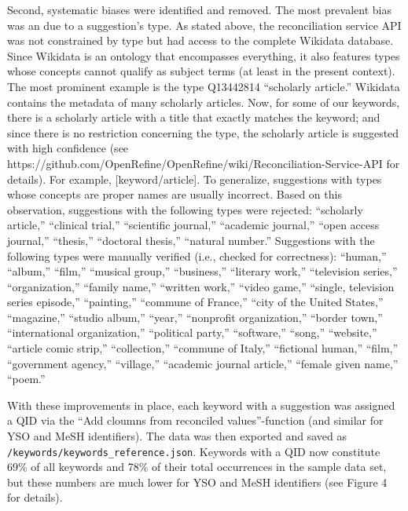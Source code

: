 Second, systematic biases were identified and removed. The most
prevalent bias was an due to a suggestion's type. As stated above, the
reconciliation service API was not constrained by type but had access to
the complete Wikidata database. Since Wikidata is an ontology that
encompasses everything, it also features types whose concepts cannot
qualify as subject terms (at least in the present context). The most
prominent example is the type Q13442814 ``scholarly article.'' Wikidata
contains the metadata of many scholarly articles. Now, for some of our
keywords, there is a scholarly article with a title that exactly matches
the keyword; and since there is no restriction concerning the type, the
scholarly article is suggested with high confidence (see
https://github.com/OpenRefine/OpenRefine/wiki/Reconciliation-Service-API
for details). For example, {[}keyword/article{]}. To generalize,
suggestions with types whose concepts are proper names are usually
incorrect. Based on this observation, suggestions with the following
types were rejected: ``scholarly article,'' ``clinical trial,''
``scientific journal,'' ``academic journal,'' ``open access journal,''
``thesis,'' ``doctoral thesis,'' ``natural number.'' Suggestions with
the following types were manually verified (i.e., checked for
correctness): ``human,'' ``album,'' ``film,'' ``musical group,''
``business,'' ``literary work,'' ``television series,''
``organization,'' ``family name,'' ``written work,'' ``video game,''
``single, television series episode,'' ``painting,'' ``commune of
France,'' ``city of the United States,'' ``magazine,'' ``studio album,''
``year,'' ``nonprofit organization,'' ``border town,'' ``international
organization,'' ``political party,'' ``software,'' ``song,''
``website,'' ``article comic strip,'' ``collection,'' ``commune of
Italy,'' ``fictional human,'' ``film,'' ``government agency,''
``village,'' ``academic journal article,'' ``female given name,''
``poem.''

With these improvements in place, each keyword with a suggestion was
assigned a QID via the ``Add cloumns from reconciled values''-function
(and similar for YSO and MeSH identifiers). The data was then exported
and saved as \texttt{/keywords/keywords\_reference.json}. Keywords with
a QID now constitute 69\% of all keywords and 78\% of their total
occurrences in the sample data set, but these numbers are much lower for
YSO and MeSH identifiers (see Figure 4 for details).

